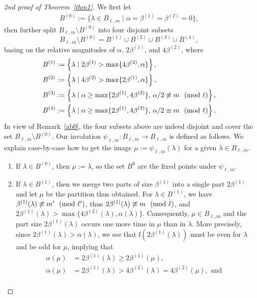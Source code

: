 \documentclass[12pt,reqno]{amsart}
\numberwithin{equation}{section}
\newcommand{\f}{\mathrm{f}}
\newcommand{\tpmod}[1]{\mkern 12mu(\textup{mod}\mkern 6mu #1)}
\begin{document}
\begin{proof}[2nd proof of Theorem~\ref{thm1}]	
We first let
\begin{align*}
	B^{(0)}:=\{\lambda\in B_{\ell,m} \mid \alpha=\beta^{(1)}=\beta^{(2)}=0\},
\end{align*}
then further split $B_{\ell,m}\setminus B^{(0)}$ into four disjoint subsets 
$$B_{\ell,m} \setminus B^{(0)}= B^{(1)}\cup B^{(2)}\cup B^{(3)}\cup B^{(4)},$$ 
basing on the relative magnitudes of $\alpha$, $2\beta^{(1)}$, and $4\beta^{(2)}$, where
\begin{align*}
		B^{(1)}&:=\left\{\lambda\mid2\beta^{(1)}>\max\{4\beta^{(2)},\alpha\}\right\}, \\
		B^{(2)}&:=\left\{\lambda\mid 4\beta^{(2)}>\max\{2\beta^{(1)},\alpha\}\right\}, \\
		B^{(3)}&:=\left\{\lambda\mid \alpha\geq \max\{2\beta^{(1)},4\beta^{(2)}\},\, \alpha/2\not\equiv m\tpmod{\ell}\right\}, \\
		B^{(4)}&:=\left\{\lambda\mid \alpha\ge \max\{2\beta^{(1)},4\beta^{(2)}\},\, \alpha/2\equiv m\tpmod{\ell}\right\}. 
\end{align*}
	In view of Remark~\ref{ab0}, the four subsets above are indeed disjoint and cover the set $B_{\ell,m}\setminus B^{(0)}$. Our involution $\psi_{\ell,m}:B_{\ell,m}\to B_{\ell,m}$ is defined as follows. We explain case-by-case how to get the image $\mu:=\psi_{\ell,m}(\lambda)$ for a given $\lambda\in B_{\ell,m}$.
\begin{enumerate}
	\item If $\lambda\in B^{(0)}$, then $\mu:=\lambda$, so the set $B^{0}$ are the fixed points under $\psi_{\ell,m}$.
	\item If $\lambda\in B^{(1)}$, then we merge two parts of size $\beta^{(1)}$ into a single part $2\beta^{(1)}$ and let $\mu$ be the partition thus obtained. For $\lambda\in B^{(1)}$, we have $\beta^{(1)}(\lambda)\not\equiv m'\tpmod{\ell'}$, thus $2\beta^{(1)}(\lambda)\not\equiv m\tpmod{\ell}$, and $2\beta^{(1)}(\lambda)>\max\{4\beta^{(2)}(\lambda),\alpha(\lambda)\}$. Consequently, $\mu\in B_{\ell,m}$ and the part size $2\beta^{(1)}(\lambda)$ occurs one more time in $\mu$ than in $\lambda$. More precisely, since $2\beta^{(1)}(\lambda)>\alpha(\lambda)$, we see that $\f(2\beta^{(1)}(\lambda))$ must be even for $\lambda$ and be odd for $\mu$, implying that
	\begin{align*}
		\alpha(\mu) &=2\beta^{(1)}(\lambda)\geq2\beta^{(1)}(\mu),\\
		\alpha(\mu) &=2\beta^{(1)}(\lambda)>4\beta^{(2)}(\lambda)=4\beta^{(2)}(\mu),\text{ and }\\

\end{align*}
\end{enumerate}
\end{proof}
\end{document}
